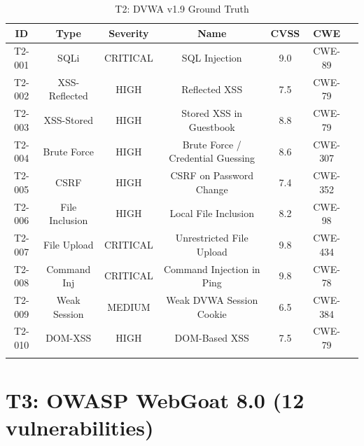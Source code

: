 \documentclass[12pt,a4paper,oneside]{book}
\begin{document}
\begin{longtable}{|c|c|c|c|c|c|c|}
\hline
\textbf{ID} & \textbf{Type} & \textbf{Severity} & \textbf{Name} & \textbf{CVSS} & \textbf{CWE} \\ \hline
\endhead
T2-001 & SQLi & CRITICAL & SQL Injection & 9.0 & CWE-89 \\ \hline
T2-002 & XSS-Reflected & HIGH & Reflected XSS & 7.5 & CWE-79 \\ \hline
T2-003 & XSS-Stored & HIGH & Stored XSS in Guestbook & 8.8 & CWE-79 \\ \hline
T2-004 & Brute Force & HIGH & Brute Force / Credential Guessing & 8.6 & CWE-307 \\ \hline
T2-005 & CSRF & HIGH & CSRF on Password Change & 7.4 & CWE-352 \\ \hline
T2-006 & File Inclusion & HIGH & Local File Inclusion & 8.2 & CWE-98 \\ \hline
T2-007 & File Upload & CRITICAL & Unrestricted File Upload & 9.8 & CWE-434 \\ \hline
T2-008 & Command Inj & CRITICAL & Command Injection in Ping & 9.8 & CWE-78 \\ \hline
T2-009 & Weak Session & MEDIUM & Weak DVWA Session Cookie & 6.5 & CWE-384 \\ \hline
T2-010 & DOM-XSS & HIGH & DOM-Based XSS & 7.5 & CWE-79 \\ \hline
\caption{T2: DVWA v1.9 Ground Truth}
\label{tab:t2_ground_truth}
\end{longtable}

\section{T3: OWASP WebGoat 8.0 (12 vulnerabilities)}
\end{document}
